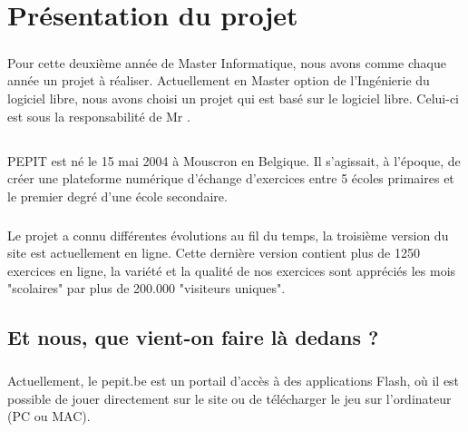 \documentclass[french]{report}
\begin{document}
\tableofcontents




\chapter{Présentation du projet}
\paragraph{}Pour cette deuxième année de Master Informatique, nous avons comme chaque année un projet à réaliser. Actuellement en Master option de l'Ingénierie du logiciel libre, nous avons choisi un projet qui est basé sur le logiciel libre. Celui-ci est sous la responsabilité de Mr \responsableProjet.
\section{\pepit}
\paragraph{}PEPIT est né le 15 mai 2004 à Mouscron en Belgique. Il s'agissait, à l'époque, de créer une plateforme numérique d'échange d'exercices entre 5 écoles primaires et le premier degré d'une école secondaire.
\paragraph{}Le projet a connu différentes évolutions au fil du temps, la troisième version du site est actuellement en ligne. Cette dernière version contient plus de 1250 exercices en ligne, la variété et la qualité de nos exercices sont appréciés les mois "scolaires" par plus de 200.000 "visiteurs uniques".
\section{Et nous, que vient-on faire là dedans ?}
\paragraph{}Actuellement, le pepit.be est un portail d'accès à des applications Flash, où il est possible de jouer directement sur le site ou de télécharger le jeu sur l'ordinateur (PC ou MAC).
\end{document}
